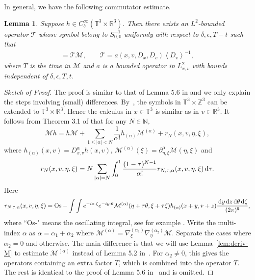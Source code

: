 \documentclass[11pt,american, reqno]{amsart}
\numberwithin{equation}{section}
\newtheorem{lemma}[theorem]{Lemma}
\newcommand{\N}{\mathbb N}
\newcommand{\R}{\mathbb R}
\newcommand{\1}{\mathds{1}}
\newcommand{\dy}{\, {\rm d} y}
\newcommand{\dz}{\, {\rm d} z}
\newcommand{\CalM}{\mathcal{M}}
\newcommand{\CalT}{\mathcal{T}}
\newcommand{\dtau}{\, {\rm d} \tau}
\newcommand{\dtheta}{\, {\rm d} \theta}
\newcommand{\dzeta}{\, {\rm d} \zeta}
\newcommand{\Eps}{\epsilon}
\newcommand{\norm}[1]{\left\lVert#1\right\rVert}
\newcommand{\vint}[1]{\left\langle#1\right\rangle}
\newcommand{\T}{\mathbb{T}}
\numberwithin{equation}{section}
\begin{document}
In general, we have the following commutator estimate. 
\begin{lemma} \label{lem:M-comm-x-v}
Suppose $h \in C^\infty_b(\T^3 \times \R^3)$. Then there exists an $L^2$-bounded operator $\CalT$ whose symbol belong
to $S^{-1}_{0,0}$ uniformly with respect to $\delta, \Eps, T-t$
such that 
\begin{align*}
 [\CalM, h] = \CalT \CalM,
\qquad
\CalT = a(x, v, D_x, D_v) \vint{D_v}^{-1},
\end{align*}
where $T$ is the time in $\CalM$ and $a$ is a bounded operator in $L^2_{x,v}$ with bounds independent of $\delta, \epsilon, T, t$.
\end{lemma}
\begin{proof} [Sketch of Proof]
The proof is similar to that of Lemma 5.6 in \cite{AMSY2020} and we only explain the steps involving (small) differences. By~\cite{RuTu2010, TuVa1998}, the symbols in $\T^3 \times \mathbb{Z}^3$ can be extended to $\T^3 \times \R^3$. Hence the calculus in $x \in \T^3$ is similar as in $v \in \R^3$. 
It follows from
Theorem 3.1 of \cite{Kuma1982} that for any $N \in \N$,
\begin{equation}\label{2.2}
\CalM h = h \CalM + \sum_{1 \leq |\alpha| <
N} \frac{1}{\alpha!} h_{(\alpha)} \CalM^{(\alpha)} +
r_N(x, v, \eta, \xi),
\end{equation}
where $h_{(\alpha)} (x, v)= D_{x,v}^{\alpha} h(x, v)$,
$\CalM^{(\alpha)}(\xi)= \partial_{\eta,\xi}^{\alpha}\CalM(\eta,\xi)$
and
\begin{align*}
r_N(x, v,\eta, \xi) = N \sum_{|\alpha| = N} \int_0^1
\frac{(1-\tau)^{N-1}}{\alpha !} r_{N,\tau,\alpha}(x, v,\eta, \xi)
\dtau.
\end{align*}
Here
\begin{align*}
r_{N,\tau,\alpha}(x,v,\eta,\xi) = \mbox{Os}- \int \int e^{-iz\cdot \zeta} e^{-i y \cdot \theta}
\CalM^{(\alpha)}(\eta + \tau \theta, \xi+ \tau \zeta) h_{(\alpha)}(x + y, v+z)
\frac{\dy\dz\dtheta\dzeta}{(2\pi)^6},
\end{align*} where ``Os-" means the
oscillating integral, see for example \cite{Kuma1982}. Write the multi-index $\alpha$ as $\alpha = \alpha_1 + \alpha_2$ where $\CalM^{(\alpha)} = \nabla_\xi^{(\alpha_1)} \nabla_\eta^{(\alpha_2)} \CalM$. Separate the cases where $\alpha_2 = 0$ and otherwise. The main difference is that we will use Lemma~\ref{lem:deriv-M} to estimate $\CalM^{(\alpha)}$ instead of Lemma 5.2 in~\cite{AMSY2020}. For $\alpha_2 \neq 0$, this gives the operators containing an extra factor $T$, which is combined into the operator $T$. The rest is identical to the proof of Lemma 5.6 in~\cite{AMSY2020} and is omitted.   
\end{proof}
\end{document}

